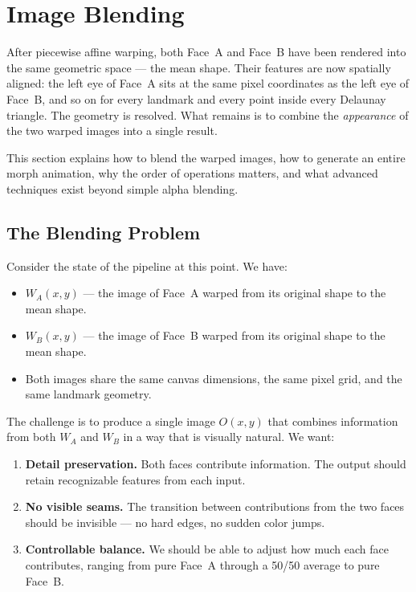 \section{Image Blending}

After piecewise affine warping, both Face~A and Face~B have been rendered into the same geometric
space --- the mean shape. Their features are now spatially aligned: the left eye of Face~A sits at
the same pixel coordinates as the left eye of Face~B, and so on for every landmark and every point
inside every Delaunay triangle. The geometry is resolved. What remains is to combine the
\emph{appearance} of the two warped images into a single result.

This section explains how to blend the warped images, how to generate an entire morph animation,
why the order of operations matters, and what advanced techniques exist beyond simple alpha
blending.

\subsection{The Blending Problem}

Consider the state of the pipeline at this point. We have:

\begin{itemize}
    \item $W_A(x, y)$ --- the image of Face~A warped from its original shape to the mean shape.
    \item $W_B(x, y)$ --- the image of Face~B warped from its original shape to the mean shape.
    \item Both images share the same canvas dimensions, the same pixel grid, and the same
          landmark geometry.
\end{itemize}

The challenge is to produce a single image $O(x, y)$ that combines information from both
$W_A$ and $W_B$ in a way that is visually natural. We want:

\begin{enumerate}
    \item \textbf{Detail preservation.} Both faces contribute information. The output should
          retain recognizable features from each input.
    \item \textbf{No visible seams.} The transition between contributions from the two faces
          should be invisible --- no hard edges, no sudden color jumps.
    \item \textbf{Controllable balance.} We should be able to adjust how much each face
          contributes, ranging from pure Face~A through a 50/50 average to pure Face~B.
\end{enumerate}


